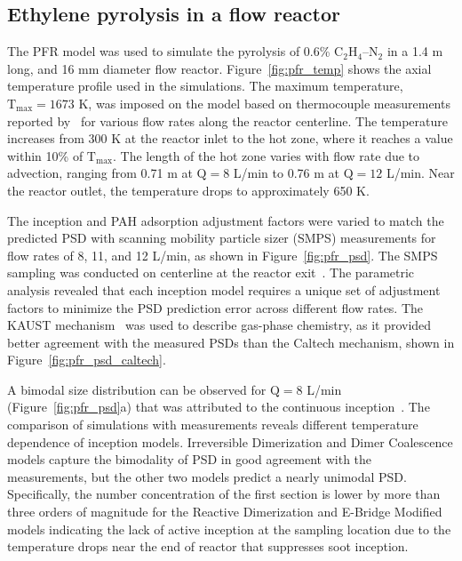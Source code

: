 \subsection{Ethylene pyrolysis in a flow reactor}
The PFR model was used to simulate the pyrolysis of 0.6\% $\mathrm{C_2H_4}$–$\mathrm{N_2}$ in a 1.4 m long, and 16 mm diameter flow reactor. Figure~\ref{fig:pfr_temp} shows the axial temperature profile used in the simulations. The maximum temperature, $\mathrm{T_{max}} = 1673$ K, was imposed on the model based on thermocouple measurements reported by~\citet{mei2019quantitative} for various flow rates along the reactor centerline. The temperature increases from 300 K at the reactor inlet to the hot zone, where it reaches a value within 10\% of $\mathrm{T_{max}}$. The length of the hot zone varies with flow rate due to advection, ranging from 0.71 m at $\mathrm{Q}=8$ L/min to 0.76 m at $\mathrm{Q}=12$ L/min. Near the reactor outlet, the temperature drops to approximately 650 K.

The inception and PAH adsorption adjustment factors were varied to match the predicted PSD with scanning mobility particle sizer
(SMPS) measurements for flow rates of 8, 11, and 12 L/min, as shown in Figure~\ref{fig:pfr_psd}. The SMPS sampling was conducted on centerline at the reactor exit~\citep{mei2019quantitative}. The parametric analysis revealed that each inception model requires a unique set of adjustment factors to minimize the PSD prediction error across different flow rates. The KAUST mechanism~\citep{wang2013pah} was used to describe gas-phase chemistry, as it provided better agreement with the measured PSDs than the Caltech mechanism, shown in Figure~\ref{fig:pfr_psd_caltech}.

A bimodal size distribution can be observed for $\mathrm{Q}=8$ L/min (Figure~\ref{fig:pfr_psd}a) that was attributed to the continuous inception~\citep{zhao2003measurement}. The comparison of simulations with measurements reveals different temperature dependence of inception models. Irreversible Dimerization and Dimer Coalescence models capture the bimodality of PSD in good agreement with the measurements, but the other two models predict a nearly unimodal PSD. Specifically, the number concentration of the first section is lower by more than three orders of magnitude for the Reactive Dimerization and E-Bridge Modified models indicating the lack of active inception at the sampling location due to the temperature drops near the end of reactor that suppresses soot inception.

